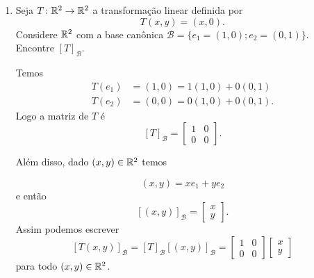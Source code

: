 \begin{exemplos}
    \begin{enumerate}[label={\arabic*})]
        \item Seja $T \colon \mathbb{R}^2 \to \mathbb{R}^2$ a transformação linear definida por
        \[
          T(x,y) = (x,0).
        \]
        Considere $\mathbb{R}^2$ com a base canônica $\mathcal{B} = \{e_1=(1,0);e_2=(0,1)\}$. Encontre $[T]_\mathcal{B}$.
        \begin{solucao}
            Temos
            \begin{align*}
                T(e_1) &= (1,0) = 1(1,0) + 0(0,1)\\
                T(e_2) &= (0,0) = 0(1,0) + 0(0,1).
            \end{align*}
            Logo a matriz de $T$ é
            \[
                [T]_\mathcal{B} = \begin{bmatrix}
                1 & 0\\
                0 & 0
                \end{bmatrix}.
            \]

            Além disso, dado $(x,y) \in \mathbb{R}^2$ temos

            \[
                (x,y) = xe_1 + ye_2
            \]
            e então
            \[
                [(x,y)]_\mathcal{B} = \begin{bmatrix}
                x\\y
                \end{bmatrix}.
            \]
            Assim podemos escrever
            \[
                [T(x,y)]_\mathcal{B} = [T]_\mathcal{B}[(x,y)]_\mathcal{B} = \begin{bmatrix}
                1 & 0\\
                0 & 0
                \end{bmatrix}\begin{bmatrix}
                x\\y
                \end{bmatrix}
            \]
            para todo $(x,y) \in \mathbb{R}^2$.
        \end{solucao}


\end{enumerate}
\end{exemplos}
